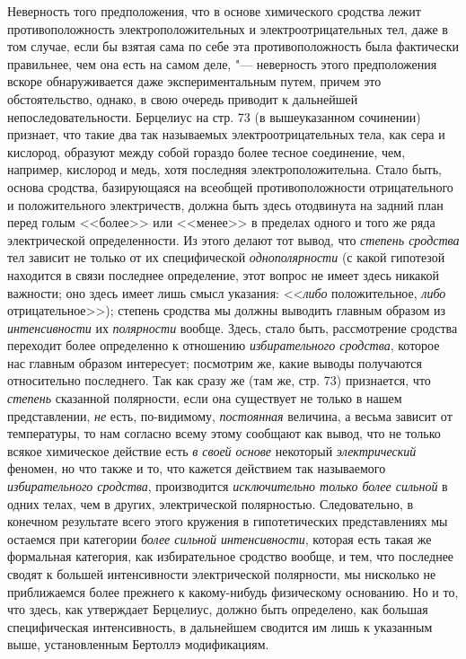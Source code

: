 Неверность того предположения, что в основе химического сродства лежит
противоположность электроположительных и электроотрицательных тел, даже в
том случае, если бы взятая сама по себе эта противоположность была
фактически правильнее, чем она есть на самом деле, "--- неверность этого
предположения вскоре обнаруживается даже экспериментальным путем, причем
это обстоятельство, однако, в свою очередь приводит к дальнейшей
непоследовательности. Берцелиус на стр. 73 (в вышеуказанном сочинении)
признает, что такие два так называемых электроотрицательных тела, как сера
и кислород, образуют между собой гораздо более тесное соединение, чем,
например, кислород и медь, хотя последняя электроположительна. Стало быть,
основа сродства, базирующаяся на всеобщей противоположности отрицательного
и положительного электричеств, должна быть здесь отодвинута на задний план
перед голым <<более>> или <<менее>> в пределах одного и того же ряда
электрической определенности. Из этого делают тот вывод, что
{\em степень сродства} тел зависит не только от их
специфической {\em однополярности} (с какой гипотезой
находится в связи последнее определение, этот вопрос не имеет здесь никакой
важности; оно здесь имеет лишь смысл указания: <<{\em либо} положительное,
{\em либо} отрицательное>>); степень сродства мы должны
выводить главным образом из {\em интенсивности} их
{\em полярности} вообще. Здесь, стало быть,
рассмотрение сродства переходит более определенно к отношению
{\em избирательного сродства}, которое нас главным
образом интересует; посмотрим же, какие выводы получаются относительно
последнего. Так как сразу же (там же, стр. 73) признается, что
{\em степень} сказанной полярности, если она существует
не только в нашем представлении, {\em не} есть,
по-видимому, {\em постоянная} величина, а весьма зависит
от температуры, то нам согласно всему этому сообщают как вывод, что не
только всякое химическое действие есть {\em в своей
основе} некоторый {\em электрический} феномен, но что
также и то, что кажется действием так называемого
{\em избирательного сродства}, производится
{\em исключительно только более сильной} в одних телах,
чем в других, электрической полярностью. Следовательно, в конечном
результате всего этого кружения в гипотетических представлениях мы остаемся
при категории {\em более сильной интенсивности},
которая есть такая же формальная категория, как избирательное сродство
вообще, и тем, что последнее сводят к большей интенсивности электрической
полярности, мы нисколько не приближаемся более прежнего к какому-нибудь
физическому основанию. Но и то, что здесь, как утверждает Берцелиус, должно
быть определено, как большая специфическая интенсивность, в дальнейшем
сводится им лишь к указанным выше, установленным Бертоллэ модификациям.

